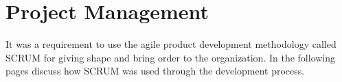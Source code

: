 \chapter{Project Management}
\label{chap:project_management_chapter}
It was a requirement to use the agile product development methodology called SCRUM for giving shape and bring order to the organization. In the following pages discuss how SCRUM was used through the development process.

